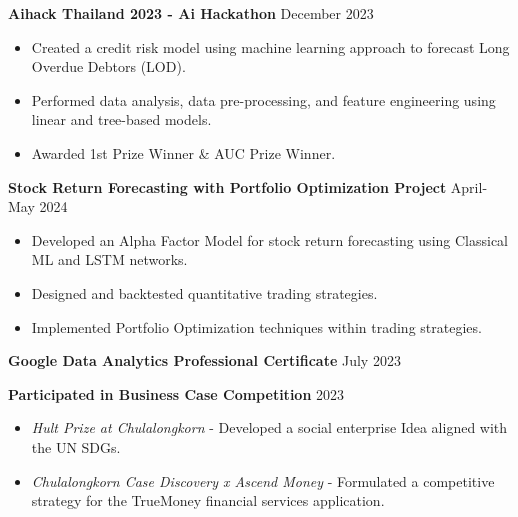\documentclass[11pt]{article}
\begin{document}
\textbf{Aihack Thailand 2023 - Ai Hackathon} \hfill December 2023
\begin{itemize}[noitemsep, topsep=0pt, partopsep=0pt, parsep=0pt]
    \item Created a credit risk model using machine learning approach to forecast Long Overdue Debtors (LOD).
    \item Performed data analysis, data pre-processing, and feature engineering using linear and tree-based models.
    \item Awarded 1st Prize Winner \& AUC Prize Winner.
\end{itemize}

\vspace{3pt}

\textbf{Stock Return Forecasting with Portfolio Optimization Project} \hfill April-May 2024
\begin{itemize}[noitemsep, topsep=0pt, partopsep=0pt, parsep=0pt]
    \item Developed an Alpha Factor Model for stock return forecasting using Classical ML and LSTM networks.
    \item Designed and backtested quantitative trading strategies.
    \item Implemented Portfolio Optimization techniques within trading strategies.
\end{itemize}

\vspace{3pt}

\textbf{Google Data Analytics Professional Certificate} \hfill July 2023

\vspace{3pt}

\textbf{Participated in Business Case Competition} \hfill 2023
\begin{itemize}[noitemsep, topsep=0pt, partopsep=0pt, parsep=0pt]
    \item \textit{Hult Prize at Chulalongkorn} - Developed a social enterprise Idea aligned with the UN SDGs.
    \item \textit{Chulalongkorn Case Discovery x Ascend Money} - Formulated a competitive strategy for the TrueMoney financial services application.
\end{itemize}


\end{document}
